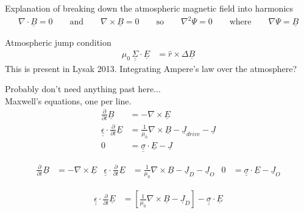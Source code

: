 \documentclass{article}
\begin{document}
Explanation of breaking down the atmospheric magnetic field into harmonics
\begin{align*}
  \nabla \cdot \underline{B} = 0 \qquad 
  \mathrm{and} \qquad 
  \nabla \times \underline{B} = 0 \qquad 
  \mathrm{so} \qquad 
  \nabla^2 \Psi = 0 \qquad
  \mathrm{where} \qquad
  \nabla \Psi = \underline{B}
\end{align*}



Atmospheric jump condition
\begin{align*}
  \mu_0 \, \underline{ \underline{\Sigma} } \cdot \underline{E} & = 
  \hat{r} \times \Delta \underline{B}
\end{align*}
This is present in Lysak 2013. Integrating Ampere’s law over the atmosphere? 




Probably don't need anything past here... \\ 



Maxwell’s equations, one per line. 
\begin{align*}
  \frac{\partial}{\partial t} \underline{B} &=
  - \nabla \times \underline{E} \\
  \underline{ \underline{\epsilon} } \cdot \frac{\partial}{\partial t} \underline{E} &=
  \frac{1}{\mu_0} \nabla \times \underline{B} - 
  \underline{J}_{drive} - 
  \underline{J} \\
  0 & =
  \underline{ \underline{\sigma} } \cdot \underline{E} - \underline{J}
\end{align*}



\begin{align*}
  \frac{\partial}{\partial t} \underline{B} &=
    -\nabla \times \underline{E} & 
  \underline{ \underline{\epsilon} } \cdot \frac{\partial}{\partial t} \underline{E} &=
    \frac{1}{\mu_0} \nabla \times \underline{B} - \underline{J}_D - \underline{J}_O &
  0 &=
    \underline{ \underline{\sigma} } \cdot \underline{E} - \underline{J}_O
\end{align*}




\begin{align*}
  \underline{ \underline{\epsilon} } \cdot \frac{\partial}{\partial t} \underline{E} &=
    \left[ \frac{1}{\mu_0} \nabla \times \underline{B} - 
    \underline{J}_D \right] - 
    \underline{ \underline{\sigma} } \cdot \underline{E}
\end{align*}
\end{document}
